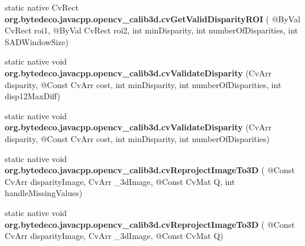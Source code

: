 \begin{DoxyCompactItemize}
\item 
\mbox{\label{group__calib3d__c_ga4db647b3794806664f8cc04df97eee72}} 
static native Cv\+Rect {\bfseries org.\+bytedeco.\+javacpp.\+opencv\+\_\+calib3d.\+cv\+Get\+Valid\+Disparity\+R\+OI} ( @By\+Val Cv\+Rect roi1, @By\+Val Cv\+Rect roi2, int min\+Disparity, int number\+Of\+Disparities, int S\+A\+D\+Window\+Size)
\item 
\mbox{\label{group__calib3d__c_ga931e80ba6f3b0c9b99be7a592ff397d1}} 
static native void {\bfseries org.\+bytedeco.\+javacpp.\+opencv\+\_\+calib3d.\+cv\+Validate\+Disparity} (Cv\+Arr disparity, @Const Cv\+Arr cost, int min\+Disparity, int number\+Of\+Disparities, int disp12\+Max\+Diff)
\item 
\mbox{\label{group__calib3d__c_ga6d1808a1487a992e3108fa8f02e585cc}} 
static native void {\bfseries org.\+bytedeco.\+javacpp.\+opencv\+\_\+calib3d.\+cv\+Validate\+Disparity} (Cv\+Arr disparity, @Const Cv\+Arr cost, int min\+Disparity, int number\+Of\+Disparities)
\item 
\mbox{\label{group__calib3d__c_gae3f57bc51f598098b1a35e59f5c66952}} 
static native void {\bfseries org.\+bytedeco.\+javacpp.\+opencv\+\_\+calib3d.\+cv\+Reproject\+Image\+To3D} ( @Const Cv\+Arr disparity\+Image, Cv\+Arr \+\_\+3d\+Image, @Const Cv\+Mat Q, int handle\+Missing\+Values)
\item 
\mbox{\label{group__calib3d__c_ga9d3513aba14b702a53fab52c28000625}} 
static native void {\bfseries org.\+bytedeco.\+javacpp.\+opencv\+\_\+calib3d.\+cv\+Reproject\+Image\+To3D} ( @Const Cv\+Arr disparity\+Image, Cv\+Arr \+\_\+3d\+Image, @Const Cv\+Mat Q)
\end{DoxyCompactItemize}

